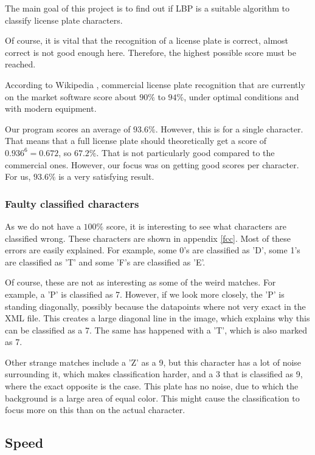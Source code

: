 \documentclass[a4paper]{article}
\begin{document}
The main goal of this project is to find out if LBP is a suitable algorithm to
classify license plate characters.

Of course, it is vital that the recognition of a license plate is correct,
almost correct is not good enough here. Therefore, the highest possible score
must be reached.

According to Wikipedia \cite{wikiplate}, commercial license plate recognition
that are currently on the market software score about $90\%$ to $94\%$, under
optimal conditions and with modern equipment.

Our program scores an average of $93.6\%$. However, this is for a single
character. That means that a full license plate should theoretically
get a score of $0.936^6 = 0.672$, so $67.2\%$. That is not particularly
good compared to the commercial ones. However, our focus was on getting
good scores per character. For us, $93.6\%$ is a very satisfying result.

\subsubsection*{Faulty classified characters}

As we do not have a $100\%$ score, it is interesting to see what characters are
classified wrong. These characters are shown in appendix \ref{fcc}. Most of
these errors are easily explained. For example, some 0's are classified as
'D', some 1's are classified as 'T' and some 'F's are classified as 'E'.

Of course, these are not as interesting as some of the weird matches. For
example, a 'P' is classified as 7. However, if we look more closely, the 'P' is
standing diagonally, possibly because the datapoints where not very exact in
the XML file. This creates a large diagonal line in the image, which explains
why this can be classified as a 7. The same has happened with a 'T', which is
also marked as 7.

Other strange matches include a 'Z' as a 9, but this character has a lot of
noise surrounding it, which makes classification harder, and a 3 that is
classified as 9, where the exact opposite is the case. This plate has no noise,
due to which the background is a large area of equal color. This might cause
the classification to focus more on this than on the actual character.

\subsection{Speed}
\end{document}
